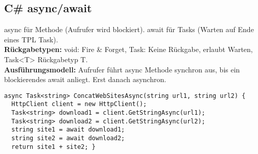 \subsection{C\# async/await}
\textcolor{b}{async} für Methode (Aufrufer wird blockiert). \textcolor{b}{await} für Tasks (Warten auf Ende eines TPL Task).\\
\textcolor{b}{\textbf{Rückgabetypen:}} \textcolor{b}{void}: Fire \& Forget, \textcolor{b}{Task}: Keine Rückgabe, erlaubt Warten, \textcolor{b}{Task<T>} Rückgabetyp T.\\
\textcolor{b}{\textbf{Ausführungsmodell:}} Aufrufer führt async Methode synchron aus, bis ein blockierendes await anliegt. Erst danach asynchron.
\begin{lstlisting}
async Task<string> ConcatWebSitesAsync(string url1, string url2) {
  HttpClient client = new HttpClient();
  Task<string> download1 = client.GetStringAsync(url1);
  Task<string> download2 = client.GetStringAsync(url2);
  string site1 = await download1;
  string site2 = await download2;
  return site1 + site2; }
\end{lstlisting}